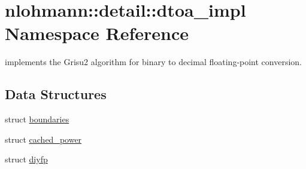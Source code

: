 \hypertarget{namespacenlohmann_1_1detail_1_1dtoa__impl}{}\section{nlohmann\+:\+:detail\+:\+:dtoa\+\_\+impl Namespace Reference}
\label{namespacenlohmann_1_1detail_1_1dtoa__impl}


implements the Grisu2 algorithm for binary to decimal floating-\/point conversion.  


\subsection*{Data Structures}
\begin{DoxyCompactItemize}
\item 
struct \hyperlink{structnlohmann_1_1detail_1_1dtoa__impl_1_1boundaries}{boundaries}
\item 
struct \hyperlink{structnlohmann_1_1detail_1_1dtoa__impl_1_1cached__power}{cached\+\_\+power}
\item 
struct \hyperlink{structnlohmann_1_1detail_1_1dtoa__impl_1_1diyfp}{diyfp}
\end{DoxyCompactItemize}
